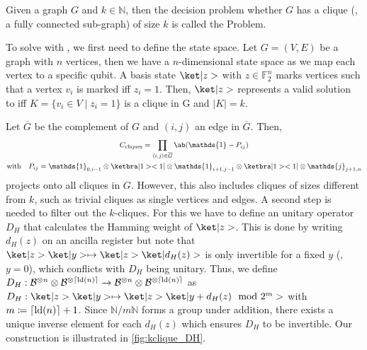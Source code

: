 \begin{definition}
    Given a graph $G$ and $k \in \mathds{N}$, then the decision problem whether $G$ has a clique (\ie, a fully connected sub-graph) of size $k$ is called the \kclique Problem.
\end{definition}

To solve \kclique with \QAOA, we first need to define the state space. Let $G = (V, E)$ be a graph with $n$ vertices, then we have a $n$-dimensional state space as we map each vertex to a specific qubit. A basis state $\ket|z>$ with $z \in \mathds{F}_2^n$ marks vertices such that a vertex $v_i$ is marked iff $z_i = 1$. Then, $\ket|z>$ represents a valid solution to \kclique iff $K = \{v_i \in V \mid z_i = 1\}$ is a clique in G and $|K| = k$. 

Let $\overline{G}$ be the complement of $G$ and $(i, j)$ an edge in $\overline{G}$. Then,
\begin{equation}
\begin{gathered}
    \Ccliques = \prod_{(i,j) \in \overline{G}} \ab(\mathds{1} - P_{ij}) \\
    \text{with} \quad P_{ij} = \mathds{1}_{0, i - 1} \otimes \ketbra|1><1| \otimes \mathds{1}_{i+1,j-1} \otimes \ketbra|1><1| \otimes \mathds{j}_{j+1,n}
\end{gathered}
\end{equation}
projects onto all cliques in $G$. However, this also includes cliques of sizes different from $k$, such as trivial cliques as single vertices and edges. A second step is needed to filter out the $k$-cliques. For this we have to define an unitary operator $D_H$ that calculates the Hamming weight of $\ket|z>$. This is done by writing $d_H(z)$ on an ancilla register but note that $\ket|z>\ket|y> \mapsto \ket|z>\ket|d_H (z)>$ is only invertible for a fixed $y$ (\eg, $y=0$), which conflicts with $D_H$ being unitary. Thus, we define $D_H: \mathcal{B}^{\otimes n} \otimes \mathcal{B}^{\otimes \lceil \operatorname*{ld}(n) \rceil} \to \mathcal{B}^{\otimes n} \otimes \mathcal{B}^{\otimes \lceil \operatorname*{ld}(n) \rceil}$ as $D_H : \ket|z>\ket|y> \mapsto \ket|z>\ket|y + d_H (z) \mod 2^m>$ with $m \coloneqq \lceil\operatorname*{ld}(n)\rceil + 1$. Since $\mathds{N}/m\mathds{N}$ forms a group under addition, there exists a unique inverse element for each $d_H(z)$ which ensures $D_H$ to be invertible. Our construction is illustrated in \cref{fig:kclique_DH}.

